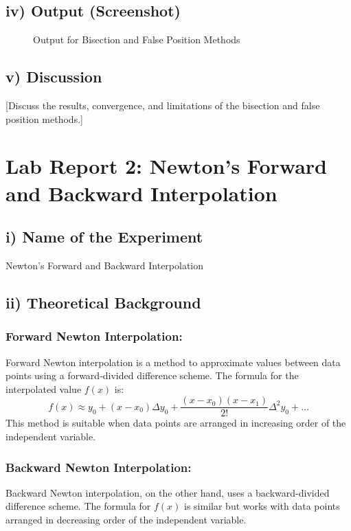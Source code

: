 \documentclass[a4paper,12pt]{article}
\begin{document}
\subsection*{iv) Output (Screenshot)}
\begin{figure}[H]
    \centering
    \caption{Output for Bisection and False Position Methods}
\end{figure}

\subsection*{v) Discussion}
[Discuss the results, convergence, and limitations of the bisection and false position methods.]

\newpage

\section*{Lab Report 2: Newton's Forward and Backward Interpolation}

\subsection*{i) Name of the Experiment}
Newton's Forward and Backward Interpolation

\subsection*{ii) Theoretical Background}
\subsubsection*{Forward Newton Interpolation:}
Forward Newton interpolation is a method to approximate values between data points using a forward-divided difference scheme. The formula for the interpolated value \(f(x)\) is:
\[ f(x) \approx y_0 + (x - x_0)\Delta y_0 + \frac{(x - x_0)(x - x_1)}{2!}\Delta^2 y_0 + \ldots \]
This method is suitable when data points are arranged in increasing order of the independent variable.

\subsubsection*{Backward Newton Interpolation:}
Backward Newton interpolation, on the other hand, uses a backward-divided difference scheme. The formula for \(f(x)\) is similar but works with data points arranged in decreasing order of the independent variable.
\end{document}
